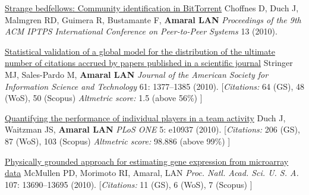 \NumberedItem{\makebox[0.8cm][r]{[90]}}
\href{/people/amaral/strange-bedfellows-community-identification-bittorrent}
{Strange bedfellows: Community identification in BitTorrent}
\newline
Choffnes D, Duch J, Malmgren RD, Guimera R, Bustamante F, {\textbf{Amaral LAN}}
\newline
\textit{Proceedings of the 9th ACM IPTPS International Conference on Peer-to-Peer Systems}
13 (2010).
\newline
\Gap
~
\Gap

\NumberedItem{\makebox[0.8cm][r]{[89]}}
\href{/people/amaral/statistical-validation-global-model-distribution-ultimate-number-citations-accrued-papers-published-scientific-journal}
{Statistical validation of a global model for the distribution of the ultimate number of citations accrued by papers published in a scientific journal}
\newline
Stringer MJ, Sales-Pardo M, {\textbf{Amaral LAN}}
\newline
\textit{Journal of the American Society for Information Science and Technology}
    61:
1377--1385 (2010).
    \newline
    \hfill [{\em{Citations:}} 64 (GS),
    48 (WoS), 50 (Scopus)
        {\hspace*{1cm} \em{Altmetric score:}}  1.5 (above 56\%)
    ]
\newline
\Gap
~
\Gap

\NumberedItem{\makebox[0.8cm][r]{[88]}}
\href{/people/amaral/quantifying-performance-individual-players-team-activity}
{Quantifying the performance of individual players in a team activity}
\newline
Duch J, Waitzman JS, {\textbf{Amaral LAN}}
\newline
\textit{PLoS ONE}
    5:
e10937 (2010).
    \newline
    \hfill [{\em{Citations:}} 206 (GS),
    87 (WoS), 103 (Scopus)
        {\hspace*{1cm} \em{Altmetric score:}}  98.886 (above 99\%)
    ]
\newline
\Gap
~
\Gap

\NumberedItem{\makebox[0.8cm][r]{[87]}}
\href{/people/amaral/physically-grounded-approach-estimating-gene-expression-microarray-data}
{Physically grounded approach for estimating gene expression from microarray data}
\newline
McMullen PD, Morimoto RI, Amaral, LAN
\newline
\textit{Proc. Natl. Acad. Sci. U. S. A.}
    107:
13690--13695 (2010).
    \newline
    \hfill [{\em{Citations:}} 11 (GS),
    6 (WoS), 7 (Scopus)
    ]
\newline
\Gap
~
\Gap


